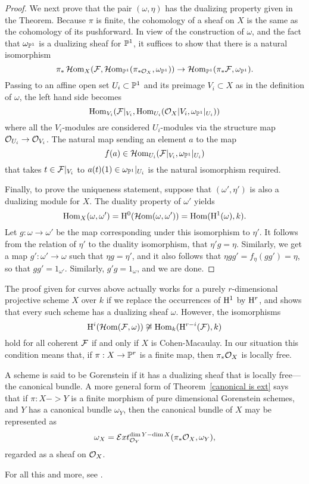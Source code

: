 \begin{proof}
We next prove that the pair $(\omega, \eta)$ has the dualizing property given in the 
Theorem.  Because $\pi$ is finite, the cohomology of a sheaf on $X$ is the same as the cohomology of its pushforward. In view of the construction of $\omega$, and the fact that $\omega_{\PP^{1}}$ is a dualizing sheaf for $\PP^{1}$, it suffices to show that there is a natural isomorphism
$$
\pi_{*}\sHom_{X}(\sF,\sHom_{\PP^{1}}(\pi_{*\sO_{X}}, \omega_{\PP^{1}})) \to \sHom_{\PP^{1}}(\pi_{*}\sF, \omega_{\PP^{1}}).
$$
Passing to an affine open set $U_{i}\subset \PP^{1}$ and its preimage $V_{i}\subset X$
as in the definition of $\omega$,  the left hand side becomes
$$
\Hom_{V_{i}}(\sF|_{V_{i}}, \Hom_{U_{i}}(\cO_{X}|V_{i}, \omega_{\PP^{1}}|_{U_{i}}))
$$
where all the $V_{i}$-modules are considered $U_{i}$-modules via the structure
map $\cO_{U_{i}} \to \cO_{V_{i}}$. The natural map sending an element $a$ to
the map 
$$
f(a) \in \sHom_{U_{i}}(\sF|_{V_{i}}, \omega_{\PP^{1}}|_{U_{i}})
$$
that takes $t\in \sF|_{V_{i}}$ to $a(t)(1)\in \omega_{\PP^{1}}|_{U_{i}}$ is the natural
isomorphism required.

Finally, to prove the uniqueness statement, suppose that $(\omega',\eta')$ is also a dualizing module for $X$. The duality property of $\omega'$ yields
$$
\Hom_{X}(\omega, \omega') = \HH^{0}(\sHom(\omega, \omega')) = \Hom(\HH^{1}(\omega), k).
$$
Let $g: \omega \to \omega'$ be the map corresponding under this isomorphism to $\eta'$. It follows from the relation of $\eta'$ to the duality isomorphism, that 
$\eta'g = \eta$. Similarly, we get a map $g':\omega'\to \omega$ such that
$\eta g = \eta'$, and it also follows that $\eta gg' = f_{\eta}(gg') =  \eta$, so that
$gg' = 1_{\omega'}$. Similarly, $g'g = 1_{\omega}$, and we are done.
\end{proof}

\begin{fact} The proof given for curves above actually works for a purely $r$-dimensional projective scheme $X$ over $k$ if we replace the occurrences of  $\HH^{1}$ by $\HH^{r}$, and shows that every such scheme has a dualizing sheaf $\omega$. However, the isomorphisms
$$
\HH^{i} (\sHom(\sF, \omega)) \not\cong \Hom_{k}(\HH^{r-i}(\sF), k) 
$$
hold for all coherent $\sF$ if and only if $X$ is Cohen-Macaulay. In our situation
this condition means that, if $\pi: X\to \PP^{r}$ is a finite map, then $\pi_{*}\cO_{X}$
is locally free.

A scheme is said to be Gorenstein if it has a dualizing sheaf that is locally free---the canonical bundle. A more general form of Theorem~\ref{canonical is ext} says that if $\pi: X -> Y$ is a finite morphism of pure dimensional Gorenstein schemes, and $Y$ has a canonical bundle $\omega_{Y}$, then the canonical bundle of $X$ may be
represented as 
$$
\omega_{X} = \sExt^{\dim Y-\dim X}_{\sO_{Y}}
(\pi_{*}\sO_{X}, \omega_{Y}),
$$ 
regarded as a sheaf on $\sO_{X}$.

For all this and more, see \cite{AltmanKleiman}.
\end{fact}

